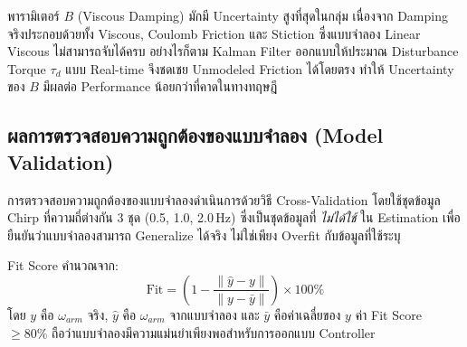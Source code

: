 พารามิเตอร์ $B$ (Viscous Damping) มักมี Uncertainty สูงที่สุดในกลุ่ม
เนื่องจาก Damping จริงประกอบด้วยทั้ง Viscous, Coulomb Friction และ Stiction
ซึ่งแบบจำลอง Linear Viscous ไม่สามารถจับได้ครบ
อย่างไรก็ตาม Kalman Filter ออกแบบให้ประมาณ Disturbance Torque $\tau_d$
แบบ Real-time จึงชดเชย Unmodeled Friction ได้โดยตรง
ทำให้ Uncertainty ของ $B$ มีผลต่อ Performance น้อยกว่าที่คาดในทางทฤษฎี


\subsection{ผลการตรวจสอบความถูกต้องของแบบจำลอง (Model Validation)}
\label{subsec:model_validation_results}

การตรวจสอบความถูกต้องของแบบจำลองดำเนินการด้วยวิธี Cross-Validation
โดยใช้ชุดข้อมูล Chirp ที่ความถี่ต่างกัน 3 ชุด (0.5, 1.0, 2.0\,Hz)
ซึ่งเป็นชุดข้อมูลที่ \emph{ไม่ได้ใช้} ใน Estimation
เพื่อยืนยันว่าแบบจำลองสามารถ Generalize ได้จริง
ไม่ใช่เพียง Overfit กับข้อมูลที่ใช้ระบุ

Fit Score คำนวณจาก:
\begin{equation}
    \text{Fit} = \left(1 - \frac{\|\hat{y} - y\|}{\|y - \bar{y}\|}\right) \times 100\%
    \label{eq:fit_score}
\end{equation}
โดย $y$ คือ $\omega_{arm}$ จริง, $\hat{y}$ คือ $\omega_{arm}$ จากแบบจำลอง
และ $\bar{y}$ คือค่าเฉลี่ยของ $y$
ค่า Fit Score $\geq 80\%$ ถือว่าแบบจำลองมีความแม่นยำเพียงพอสำหรับการออกแบบ Controller

